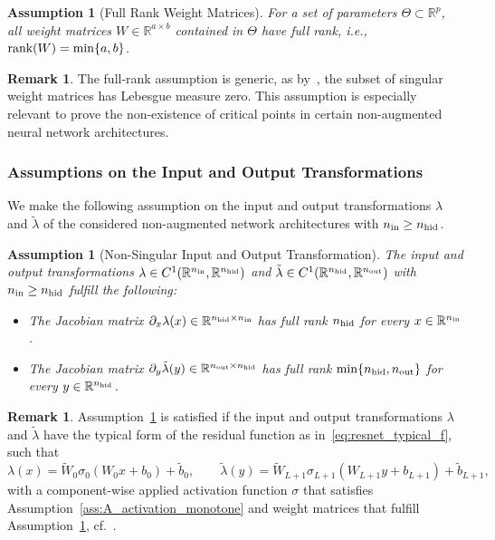 \documentclass[10pt]{article}
\newtheorem{assumpB}{Assumption}
\newtheorem{assumpC}{Assumption}
\theoremstyle{definition}
\newtheorem{remark}[theorem]{Remark}
\numberwithin{equation}{section}
\newcommand{\R}{\mathbb{R}}
\newcommand*{\nout}{n_\textup{out}}
\newcommand*{\nhid}{n_\textup{hid}}
\newcommand*{\nin}{n_\textup{in}}
\begin{document}
\begin{assumpB}[Full Rank Weight Matrices]
	\label{ass:B_weights_fullrank}
	For a set of parameters $\Theta \subset \R^p$, all weight matrices $W \in \R^{a \times b}$ contained in $\Theta$ have full rank, i.e., $\textup{rank}(W) = \min\{a,b\}$.
\end{assumpB}

\begin{remark}
	The full-rank assumption is generic, as by~\cite[Lemma~3.6]{kk2025}, the subset of singular weight matrices has Lebesgue measure zero. This assumption is especially relevant to prove the non-existence of critical points in certain non-augmented neural network architectures.
\end{remark}



\subsubsection*{Assumptions on the Input and Output Transformations}

We make the following assumption on the input and output transformations $\lambda$ and $\tilde{\lambda}$ of the considered non-augmented network architectures with $\nin \geq \nhid$. %

\begin{assumpC}[Non-Singular Input and Output Transformation] 
	\label{ass:C_input_output}
	The input and output transformations $\lambda \in C^1(\R^{\nin},\R^{\nhid})$ and $\tilde\lambda \in C^1(\R^{\nhid},\R^{\nout})$ with $\nin\geq\nhid$ fulfill the following:
	\begin{itemize}
		\item The Jacobian matrix $\partial_x \lambda(x)\in \R^{\nhid \times \nin}$ has full rank $\nhid$ for every $x \in \R^{\nin}$. 
		\item The Jacobian matrix $\partial_{y}{\tilde{\lambda}}(y)\in \R^{\nout \times \nhid}$ has full rank $\min\{\nhid,\nout\}$ for every $y \in \R^{\nhid}$.
	\end{itemize}
\end{assumpC}


\begin{remark} \label{rem:lambda_typical}
	Assumption~\ref{ass:C_input_output} is satisfied if the input and output transformations $\lambda$ and $\tilde{\lambda}$ have the typical form of the residual function as in~\eqref{eq:resnet_typical_f}, such that
	\begin{equation} \label{eq:lambda_typical}
		\lambda(x) = \widetilde{W}_0 \sigma_0(W_0 x + b_0) + \tilde{b}_0, \qquad  \tilde{\lambda}(y) = \widetilde{W}_{L+1} \sigma_{L+1}(W_{L+1} y + b_{L+1}) + \tilde{b}_{L+1},
	\end{equation}
	with a component-wise applied activation function $\sigma$ that satisfies Assumption~\ref{ass:A_activation_monotone} and weight matrices that fulfill Assumption~\ref{ass:B_weights_fullrank}, cf.~\cite[Lemma C.1]{kk2025}. 
\end{remark}
\end{document}
